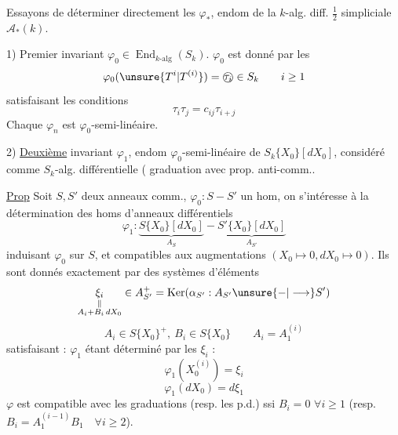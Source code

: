 Essayons de déterminer directement les $\varphi_*$, endom de la $k$-alg. diff. $\frac12$ simpliciale $\mathcal A_*(k)$.

1) Premier invariant $\varphi_0\in\operatorname{End}_{k\text{-alg}}(S_k)$.
 $\varphi_0$ est donné par les
\[
\varphi_0(\unsure{T^i|T^{(i)}})=\text{\textcircled{$\tau_i$}}\in S_k\qquad i\geq1
\]
satisfaisant les conditions
\[
\boxed{\tau_i\tau_j=c_{ij}\tau_{i+j}}
\]
Chaque $\varphi_n$ est $\varphi_0$-semi-linéaire.

2) \uline{Deuxième} invariant $\varphi_1$, endom $\varphi_0$-semi-linéaire de $S_k\{X_0\}[dX_0]$, considéré comme $S_k$-alg. différentielle ( graduation avec prop. anti-comm.\unsure{)}.

\uline{Prop} Soit $S,S'$ deux anneaux comm., $\varphi_0:S-S'$ un hom, on s'intéresse à la détermination des homs d'anneaux différentiels
\[
\varphi_1:\underbrace{S\{X_0\}[dX_0]}_{A_S}-\underbrace{S'\{X_0\}[dX_0]}_{A_{S'}}
\]
induisant $\varphi_0$ sur $S$, et compatibles aux augmentations $(X_0\longmapsto0,dX_0\longmapsto0)$. Ils sont donnés exactement par des systèmes d'éléments
\[
\underset{\substack{\Vert\\A_i+B_i\,dX_0}}{\xi_i}\in A_{S'}^+=\operatorname{Ker}(\alpha_{S'}:A_{S'}\unsure{-|\longrightarrow}S')
\]
\[
A_i\in S\{X_0\}^+,\ B_i\in S\{X_0\}\qquad A_i=A_1^{(i)}
\]
satisfaisant :
$\varphi_1$ étant déterminé par les $\xi_i$  :
\[
\varphi_1(X_0^{(i)})=\xi_i
\]
\[
\varphi_1(dX_0)=d\xi_1
\]
$\varphi$ est compatible avec les graduations (resp. les p.d.) ssi $B_i=0$ $\forall i\geq1$ (resp. $B_i=A_1^{(i-1)}B_1\quad\forall i\geq2$).
